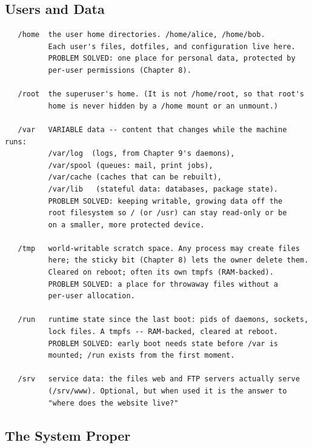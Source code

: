 \subsection{Users and Data}

\begin{verbatim}
   /home  the user home directories. /home/alice, /home/bob.
          Each user's files, dotfiles, and configuration live here.
          PROBLEM SOLVED: one place for personal data, protected by
          per-user permissions (Chapter 8).

   /root  the superuser's home. (It is not /home/root, so that root's
          home is never hidden by a /home mount or an unmount.)

   /var   VARIABLE data -- content that changes while the machine runs:
          /var/log  (logs, from Chapter 9's daemons),
          /var/spool (queues: mail, print jobs),
          /var/cache (caches that can be rebuilt),
          /var/lib   (stateful data: databases, package state).
          PROBLEM SOLVED: keeping writable, growing data off the
          root filesystem so / (or /usr) can stay read-only or be
          on a smaller, more protected device.

   /tmp   world-writable scratch space. Any process may create files
          here; the sticky bit (Chapter 8) lets the owner delete them.
          Cleared on reboot; often its own tmpfs (RAM-backed).
          PROBLEM SOLVED: a place for throwaway files without a
          per-user allocation.

   /run   runtime state since the last boot: pids of daemons, sockets,
          lock files. A tmpfs -- RAM-backed, cleared at reboot.
          PROBLEM SOLVED: early boot needs state before /var is
          mounted; /run exists from the first moment.

   /srv   service data: the files web and FTP servers actually serve
          (/srv/www). Optional, but when used it is the answer to
          "where does the website live?"
\end{verbatim}

\subsection{The System Proper}

